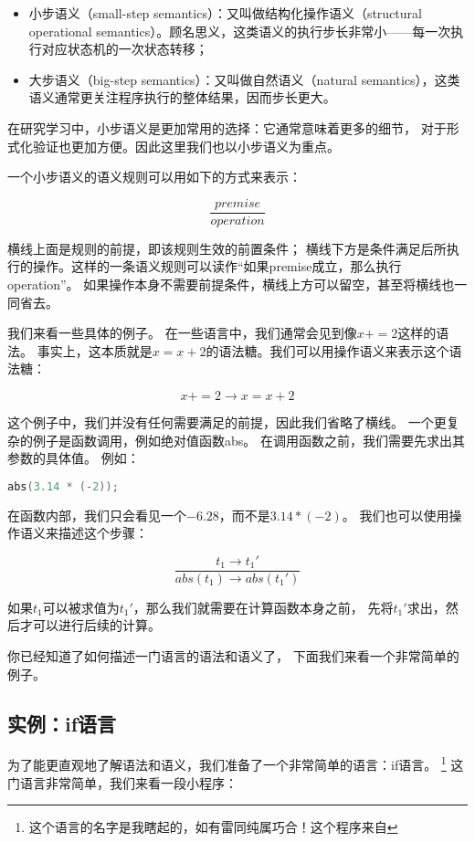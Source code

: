\documentclass[../main.tex]{subfiles}
\begin{document}
  \begin{itemize}
    \item 小步语义（small-step semantics）：又叫做结构化操作语义（structural operational semantics）。顾名思义，这类语义的执行步长非常小——每一次执行对应状态机的一次状态转移；
    \item 大步语义（big-step semantics）：又叫做自然语义（natural semantics），这类语义通常更关注程序执行的整体结果，因而步长更大。
  \end{itemize}

  \indent 在研究学习中，小步语义是更加常用的选择：它通常意味着更多的细节，
  对于形式化验证也更加方便。因此这里我们也以小步语义为重点。

  \indent 一个小步语义的语义规则可以用如下的方式来表示：

  $$\frac{premise}{operation}$$

  \indent 横线上面是规则的前提，即该规则生效的前置条件；
  横线下方是条件满足后所执行的操作。这样的一条语义规则可以读作“如果premise成立，那么执行operation”。
  如果操作本身不需要前提条件，横线上方可以留空，甚至将横线也一同省去。

  \indent 我们来看一些具体的例子。
  在一些语言中，我们通常会见到像$x += 2$这样的语法。
  事实上，这本质就是$x = x + 2$的语法糖。我们可以用操作语义来表示这个语法糖：

  $$x += 2 \to x = x + 2$$

  \indent 这个例子中，我们并没有任何需要满足的前提，因此我们省略了横线。
  一个更复杂的例子是函数调用，例如绝对值函数abs。
  在调用函数之前，我们需要先求出其参数的具体值。
  例如：
  
\begin{lstlisting}[language=c]
abs(3.14 * (-2));
\end{lstlisting}

  \indent 在函数内部，我们只会看见一个$-6.28$，而不是$3.14 * (-2)$。
  我们也可以使用操作语义来描述这个步骤：

  $$\frac{t_1 \to t_1'}{abs(t_1) \to abs(t_1')}$$

  \indent 如果$t_1$可以被求值为$t_1'$，那么我们就需要在计算函数本身之前，
  先将$t_1'$求出，然后才可以进行后续的计算。

  \indent 你已经知道了如何描述一门语言的语法和语义了，
  下面我们来看一个非常简单的例子。

  \subsection{实例：if语言}
  \indent 为了能更直观地了解语法和语义，我们准备了一个非常简单的语言：if语言。
  \footnote[1]{这个语言的名字是我瞎起的，如有雷同纯属巧合！这个程序来自\cite{tapl}}
  这门语言非常简单，我们来看一段小程序：
\end{document}
